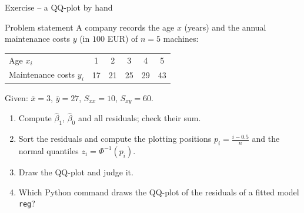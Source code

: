 \documentclass[aspectratio=169,11pt]{beamer}
\begin{document}
\begin{frame}{Exercise -- a QQ-plot by hand}
  \begin{block}{Problem statement}
    A company records the age $x$ (years) and the annual maintenance costs $y$
    (in $100$ EUR) of $n=5$ machines:
    \begin{center}
      \renewcommand{\arraystretch}{1.1}
      \begin{tabular}{lccccc}
        \toprule
        Age $x_i$ & 1 & 2 & 3 & 4 & 5\\
        Maintenance costs $y_i$ & 17 & 21 & 25 & 29 & 43\\
        \bottomrule
      \end{tabular}
    \end{center}
    Given: $\bar x=3$, $\bar y=27$, $S_{xx}=10$, $S_{xy}=60$.
    \begin{enumerate}
      \setlength{\itemsep}{0pt}
      \item Compute $\hat\beta_1$, $\hat\beta_0$ and all residuals; check their sum.
      \item Sort the residuals and compute the plotting positions
            $p_i=\frac{i-0.5}{n}$ and the normal quantiles $z_i=\Phi^{-1}(p_i)$.
      \item Draw the QQ-plot and judge it.
      \item Which Python command draws the QQ-plot of the residuals of a
            fitted model \texttt{reg}?
    \end{enumerate}
  \end{block}
\end{frame}
\end{document}
